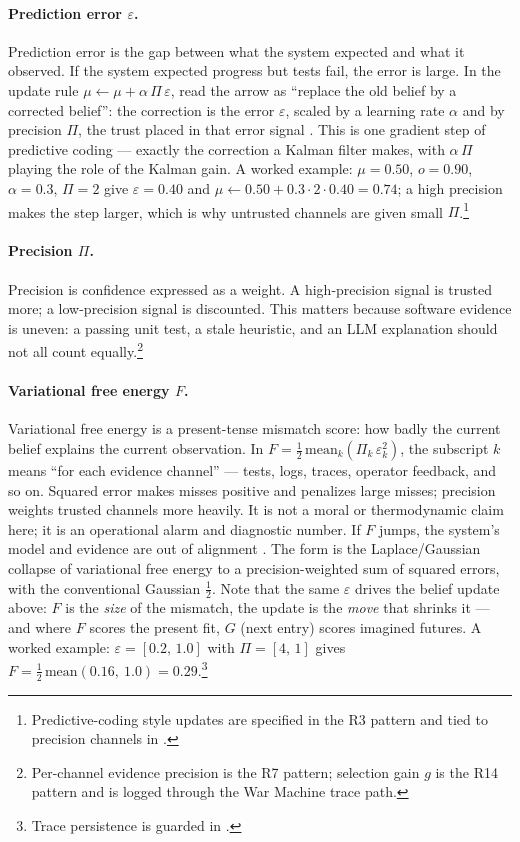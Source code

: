 \paragraph{Prediction error $\varepsilon$.} Prediction error is the gap between what the system expected and what it observed.  If the system expected progress but tests fail, the error is large.  In the update rule $\mu \leftarrow \mu + \alpha\,\Pi\,\varepsilon$, read the arrow as ``replace the old belief by a corrected belief'': the correction is the error $\varepsilon$, scaled by a learning rate $\alpha$ and by precision $\Pi$, the trust placed in that error signal \cite{FRISTON2016862}.  This is one gradient step of predictive coding --- exactly the correction a Kalman filter makes, with $\alpha\,\Pi$ playing the role of the Kalman gain.  A worked example: $\mu=0.50$, $o=0.90$, $\alpha=0.3$, $\Pi=2$ give $\varepsilon=0.40$ and $\mu \leftarrow 0.50+0.3\cdot2\cdot0.40=0.74$; a high precision makes the step larger, which is why untrusted channels are given small $\Pi$.\footnote{Predictive-coding style updates are specified in the R3 pattern and tied to precision channels in .}

\paragraph{Precision $\Pi$.} Precision is confidence expressed as a weight.  A high-precision signal is trusted more; a low-precision signal is discounted.  This matters because software evidence is uneven: a passing unit test, a stale heuristic, and an LLM explanation should not all count equally.\footnote{Per-channel evidence precision is the R7 pattern; selection gain $g$ is the R14 pattern and is logged through the War Machine trace path.}

\paragraph{Variational free energy $F$.} Variational free energy is a present-tense mismatch score: how badly the current belief explains the current observation.  In $F = \tfrac{1}{2}\,\mathrm{mean}_k(\Pi_k\,\varepsilon_k^2)$, the subscript $k$ means ``for each evidence channel'' --- tests, logs, traces, operator feedback, and so on.  Squared error makes misses positive and penalizes large misses; precision weights trusted channels more heavily.  It is not a moral or thermodynamic claim here; it is an operational alarm and diagnostic number.  If $F$ jumps, the system's model and evidence are out of alignment \cite{FRISTON2016862,friston2019freeenergyprincipleparticular}.  The form is the Laplace/Gaussian collapse of variational free energy to a precision-weighted sum of squared errors, with the conventional Gaussian $\tfrac12$.  Note that the same $\varepsilon$ drives the belief update above: $F$ is the \emph{size} of the mismatch, the update is the \emph{move} that shrinks it --- and where $F$ scores the present fit, $G$ (next entry) scores imagined futures.  A worked example: $\varepsilon=[0.2,\,1.0]$ with $\Pi=[4,\,1]$ gives $F=\tfrac12\,\mathrm{mean}(0.16,\ 1.0)=0.29$.\footnote{Trace persistence is guarded in .}

